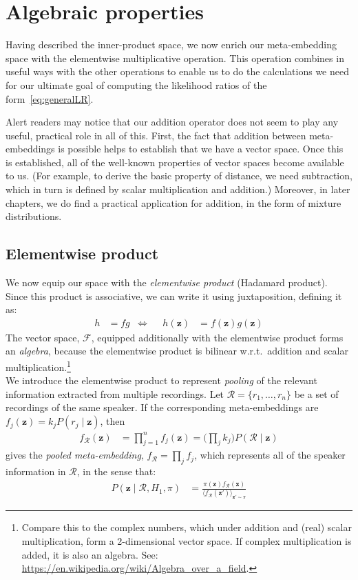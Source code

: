 \documentclass[a4paper,oneside,12pt,english]{report}
\def\zvec{\mathbf{z}}
\def\expv#1#2{\bigl\langle#1\bigr\rangle_{#2}}
\def\Rset{\mathcal{R}}
\def\Fset{\mathcal{F}}
\begin{document}
\section{Algebraic properties}
Having described the inner-product space, we now enrich our meta-embedding space with the elementwise multiplicative operation. This operation combines in useful ways with the other operations to enable us to do the calculations we need for our ultimate goal of computing the likelihood ratios of the form~\eqref{eq:generalLR}.

Alert readers may notice that our addition operator does not seem to play any useful, practical role in all of this. First, the fact that addition between meta-embeddings is possible helps to establish that we have a vector space. Once this is established, all of the well-known properties of vector spaces become available to us. (For example, to derive the basic property of distance, we need subtraction, which in turn is defined by scalar multiplication and addition.) Moreover, in later chapters, we do find a practical application for addition, in the form of mixture distributions.  


\subsection{Elementwise product}
\def\onevec{\boldsymbol{1}}
We now equip our space with the \emph{elementwise product} (Hadamard product). Since this product is associative, we can write it using juxtaposition, defining it as:
\begin{align}
h &= fg & \Leftrightarrow && h(\zvec) &= f(\zvec)g(\zvec) 
\end{align}
The vector space, $\Fset$, equipped additionally with the elementwise product forms an \emph{algebra}, because the elementwise product is bilinear w.r.t.\ addition and scalar multiplication.\footnote{Compare this to the complex numbers, which under addition and (real) scalar multiplication, form a 2-dimensional vector space. If complex multiplication is added, it is also an algebra. See: \url{https://en.wikipedia.org/wiki/Algebra_over_a_field}. }  \\

\noindent We introduce the elementwise product to represent \emph{pooling} of the relevant information extracted from multiple recordings. Let $\Rset=\{r_1,\ldots,r_n\}$ be a set of recordings of the same speaker. If the corresponding meta-embeddings are $f_j(\zvec)=k_jP(r_j\mid\zvec)$, then 
\begin{align}
f_\Rset(\zvec) &= \prod_{j=1}^n f_j(\zvec) = \bigl(\prod_j k_j\bigr) P(\Rset\mid\zvec) 
\end{align}
gives the \emph{pooled meta-embedding}, $f_\Rset = \prod_j f_j$, which represents all of the speaker information in $\Rset$, in the sense that:
\begin{align}
\label{eq:postR}
P(\zvec\mid\Rset,H_1,\pi) &= \frac{\pi(\zvec)f_\Rset(\zvec)}{\expv{f_\Rset(\zvec')}{\zvec'\sim\pi}}
\end{align}
\end{document}
